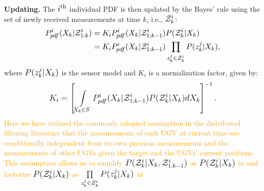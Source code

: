 	\textbf{Updating.}
	The $i\thi$ individual PDF is then updated by the Bayes' rule using the set of newly received measurements at time $k$, i.e., $\Z^i_k$:
	\begin{subequations}\label{eqn:bayes_upd}
		\small\begin{align}
				P^i_{pdf}(\X_k|\Z^i_{1:k})
				&= K_iP^i_{pdf}(\X_k|\Z^i_{1:k-1})P(\Z^i_k|\X_k)\label{subeqn:bayes_upd_general}\\
				&=K_iP^i_{pdf}(\X_k|\Z^i_{1:k-1})\prod\limits_{z^j_k\in\Z^i_k}P(z^j_k|\X_{k})\label{subeqn:bayes_upd_factor},
		\end{align}\normalsize
	\end{subequations}
	where $P(z^j_k|\X_k)$ is the sensor model and $K_i$ is a normalization factor, given by:
	\small\begin{align*}
	K_i=\left[\int\limits_{\X_k\in S} P^i_{pdf}(\X_k|\Z^i_{1:k-1})P(\Z^i_k|\X_k)d\X_k\right]^{-1}.
	\end{align*}\normalsize
	\textcolor{orange}{Here we have utilized the commonly adopted assumption \cite{furukawa2006recursive,gu2007distributed,sheng2005distributed} in the distributed filtering literature that the measurements of each UGV at current time are conditionally independent from its own previous measurements and the measurements of other UGVs given the target and the UGVs' current positions.
	This assumption allows us to simplify $P(\Z^i_k|\X_k,\Z^i_{1:k-1})$ as $P(\Z^i_k|\X_k)$ in  and factorize $P(\Z^i_k|\X_k)$ as $\prod\limits_{z^j_k\in\Z^i_k}P(z^j_k|\X_{k})$ in .}
	
